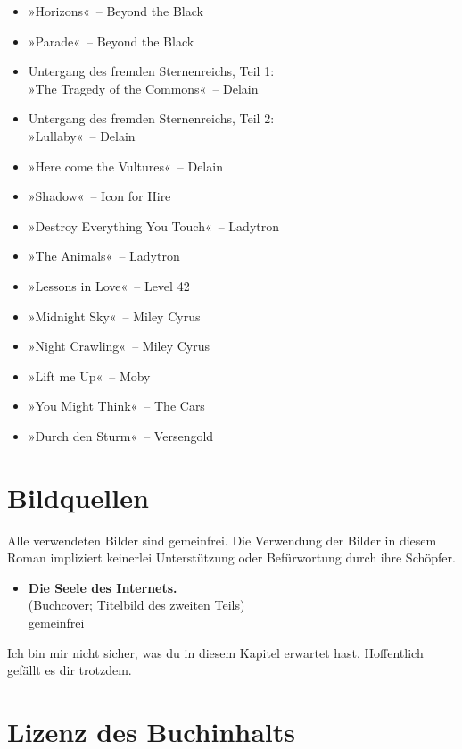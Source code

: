 \begin{itemize}
    \item »Horizons«~– Beyond the Black
    \item »Parade«~– Beyond the Black
    \item Untergang des fremden Sternenreichs, Teil 1:\\ »The Tragedy of the Commons«~– Delain
    \item Untergang des fremden Sternenreichs, Teil 2:\\ »Lullaby«~– Delain
    \item »Here come the Vultures«~– Delain
    \item »Shadow«~– Icon for Hire
    \item »Destroy Everything You Touch«~– Ladytron
    \item »The Animals«~– Ladytron
    \item »Lessons in Love«~– Level 42
    \item »Midnight Sky«~– Miley Cyrus
    \item »Night Crawling«~– Miley Cyrus
    \item »Lift me Up«~– Moby
    \item »You Might Think«~– The Cars
    \item »Durch den Sturm«~– Versengold
\end{itemize}


\chapter{Bildquellen}

Alle verwendeten Bilder sind gemeinfrei. Die Verwendung der Bilder in diesem Roman impliziert keinerlei Unterstützung oder Befürwortung durch ihre Schöpfer.

\begin{itemize}
    \item \textbf{Die Seele des Internets.}\\ (Buchcover; Titelbild des zweiten Teils)\\ gemeinfrei
\end{itemize}

Ich bin mir nicht sicher, was du in diesem Kapitel erwartet hast. Hoffentlich gefällt es dir trotzdem.


\chapter{Lizenz des Buchinhalts}

